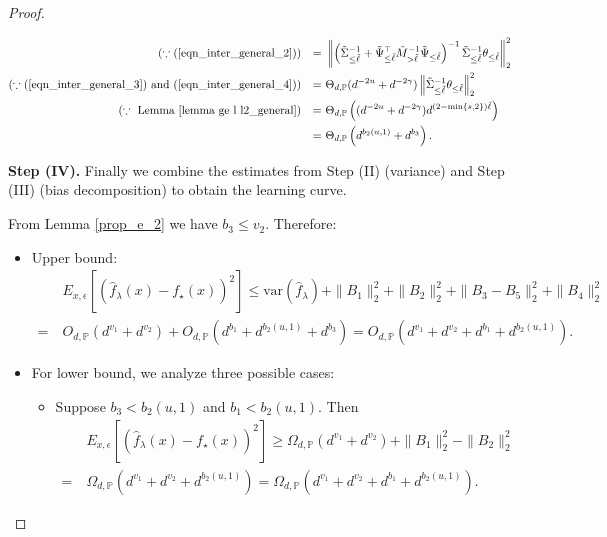 \documentclass{article}
\theoremstyle{plain}
\theoremstyle{definition}
\theoremstyle{remark}
\begin{document}
\begin{appendix}
\begin{proof}
\begin{itemize}
\begin{equation*}
\begin{aligned}
           (\because (\ref{eqn_inter_general_2})) \quad {=}&~ \left\| \left( \tilde{\Sigma}_{\leq \tilde{\ell}}^{-1} + \tilde{\Psi}_{\leq \tilde{\ell}}^{\top} \tilde{M}_{>\tilde{\ell}}^{-1} \tilde{\Psi}_{\leq \tilde{\ell}}  \right)^{-1}
           \tilde{\Sigma}_{\leq \tilde{\ell}}^{-1}   \theta_{\leq \tilde{\ell}} \right\|_{2}^{2}\\
           (\because (\ref{eqn_inter_general_3}) \text{ and } (\ref{eqn_inter_general_4})) \quad {=}&~
           \Theta_{d, \mathbb{P}}(d^{-2u} + d^{-2\gamma}) \left\| 
           \tilde{\Sigma}_{\leq \tilde{\ell}}^{-1}   \theta_{\leq \tilde{\ell}} \right\|_{2}^{2}\\
           (\because \text{ Lemma \ref{lemma ge l l2_general}}) \quad {=}&~ \Theta_{d, \mathbb{P}}\left((d^{-2u} + d^{-2\gamma}) d^{(2-\min\{s, 2\})\tilde{\ell} }\right)\\
           {=}&~
           \Theta_{d, \mathbb{P}}\left(d^{b_2(u, 1)}+d^{b_3}\right).
        \end{aligned}
    \end{equation*}
\end{itemize}

{\bf Step (IV). } Finally we combine the estimates from Step (II) (variance) and Step (III) (bias decomposition) to obtain the learning curve.

From Lemma \ref{prop_e_2} we have $b_3 \leq v_2$. Therefore: 
\begin{itemize}
    \item Upper bound:
            \begin{align*}
&~ E_{x, \epsilon} \left[ \left(\hat{f}_{\lambda}(x) - f_{\star}(x) \right)^{2} \right]
\leq  \mathrm{var}\left( \hat{f}_{\lambda} \right) + \|B_1\|_{2}^{2} + \|B_2\|_{2}^{2} + \|B_3 - B_5\|_{2}^{2} + \|B_4\|_{2}^{2}\\
= &~
O_{d, \mathbb{P}} \left( d^{v_1} + d^{v_2}\right) + O_{d, \mathbb{P}}\left( d^{b_1} + d^{b_2(u, 1)}  + d^{b_3} \right) =  O_{d, \mathbb{P}} \left( d^{v_1} + d^{v_2} + d^{b_1} + d^{b_2(u, 1)}\right).
\end{align*}

    \item For lower bound, we analyze three possible cases:
    \begin{itemize}
    
    \item Suppose $b_3 < b_2(u, 1)$ and $b_1 < b_2(u, 1)$. Then
\begin{align*}
  &~  E_{x, \epsilon} \left[ \left(\hat{f}_{\lambda}(x) - f_{\star}(x) \right)^{2} \right]
\geq 
\Omega_{d, \mathbb{P}} \left( d^{v_1} + d^{v_2}\right) + \|B_1\|_{2}^{2} - \|B_2\|_{2}^{2} \\
=&~  \Omega_{d, \mathbb{P}}\left( d^{v_1} + d^{v_2} + d^{b_2(u, 1)}\right) = \Omega_{d, \mathbb{P}}\left( d^{v_1} + d^{v_2} + d^{b_1} + d^{b_2(u, 1)}\right).
\end{align*}


\end{itemize}
\end{itemize}
\end{proof}
\end{appendix}
\end{document}
